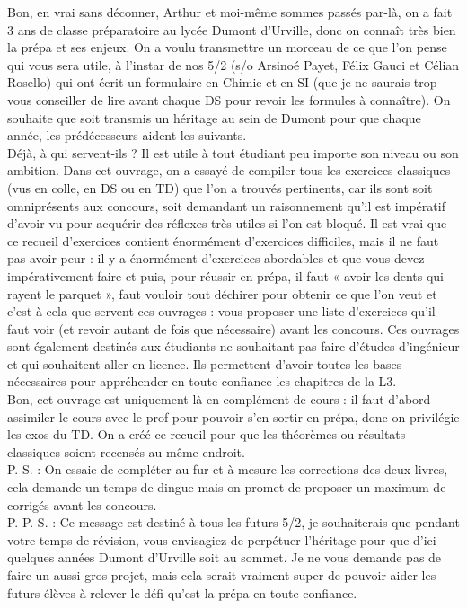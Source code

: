 \documentclass{book}
\begin{document}
		Bon, en vrai sans déconner, Arthur et moi-même sommes passés par-là, on a fait 3 ans de classe préparatoire au lycée Dumont d’Urville, donc on connaît très bien la prépa et ses enjeux. On a voulu transmettre un morceau de ce que l’on pense qui vous sera utile, à l’instar de nos 5/2 (s/o Arsinoé Payet, Félix Gauci et Célian Rosello) qui ont écrit un formulaire en Chimie et en SI (que je ne saurais trop vous conseiller de lire avant chaque DS pour revoir les formules à connaître). On souhaite que soit transmis un héritage au sein de Dumont pour que chaque année, les prédécesseurs aident les suivants.\\
		
		Déjà, à qui servent-ils ? Il est utile à tout étudiant peu importe son niveau ou son ambition. Dans cet ouvrage, on a essayé de compiler tous les exercices classiques (vus en colle, en DS ou en TD) que l’on a trouvés pertinents, car ils sont soit omniprésents aux concours, soit demandant un raisonnement qu’il est impératif d’avoir vu pour acquérir des réflexes très utiles si l’on est bloqué. Il est vrai que ce recueil d’exercices contient énormément d’exercices difficiles, mais il ne faut pas avoir peur : il y a énormément d’exercices abordables et que vous devez impérativement faire et puis, pour réussir en prépa, il faut « avoir les dents qui rayent le parquet », faut vouloir tout déchirer pour obtenir ce que l’on veut et c’est à cela que servent ces ouvrages : vous proposer une liste d’exercices qu'il faut voir (et revoir autant de fois que nécessaire) avant les concours. Ces ouvrages sont également destinés aux étudiants ne souhaitant pas faire d’études d’ingénieur et qui souhaitent aller en licence. Ils permettent d’avoir toutes les bases nécessaires pour appréhender en toute confiance les chapitres de la L3.\\
		
		Bon, cet ouvrage est uniquement là en complément de cours : il faut d’abord assimiler le cours avec le prof pour pouvoir s’en sortir en prépa, donc on privilégie les exos du TD. On a créé ce recueil pour que les théorèmes ou résultats classiques soient recensés au même endroit.\\
		
		P.-S. : On essaie de compléter au fur et à mesure les corrections des deux livres, cela demande un temps de dingue mais on promet de proposer un maximum de corrigés avant les concours.\\
		
		P.-P.-S. : Ce message est destiné à tous les futurs 5/2, je souhaiterais que pendant votre temps de révision, vous envisagiez de perpétuer l’héritage pour que d’ici quelques années Dumont d’Urville soit au sommet. Je ne vous demande pas de faire un aussi gros projet, mais cela serait vraiment super de pouvoir aider les futurs élèves à relever le défi qu’est la prépa en toute confiance. 
	
\end{document}

